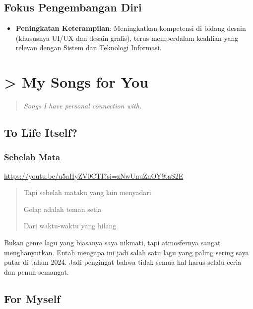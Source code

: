 \documentclass[
  letterpaper,
  DIV=11,
  numbers=noendperiod]{scrreprt}
\providecommand{\tightlist}{%
  \setlength{\itemsep}{0pt}\setlength{\parskip}{0pt}}
\begin{document}
\section{Fokus Pengembangan Diri}\label{fokus-pengembangan-diri}

\begin{itemize}
\tightlist
\item
  \textbf{Peningkatan Keterampilan}: Meningkatkan kompetensi di bidang
  desain (khususnya UI/UX dan desain grafis), terus memperdalam keahlian
  yang relevan dengan Sistem dan Teknologi Informasi.
\end{itemize}


\chapter{\textgreater{} My Songs for You}\label{my-songs-for-you}

\begin{quote}
\emph{Songs I have personal connection with.}
\end{quote}

\section{To Life Itself?}\label{to-life-itself}

\subsection{Sebelah Mata}\label{sebelah-mata}

\url{https://youtu.be/u5aHyZV0CTI?si=zNwUnuZnOY9taS2E}

\begin{quote}
Tapi sebelah mataku yang lain menyadari

Gelap adalah teman setia

Dari waktu-waktu yang hilang
\end{quote}

Bukan genre lagu yang biasanya saya nikmati, tapi atmosfernya sangat
menghanyutkan. Entah mengapa ini jadi salah satu lagu yang paling sering
saya putar di tahun 2024. Jadi pengingat bahwa tidak semua hal harus
selalu ceria dan penuh semangat.

\section{For Myself}\label{for-myself}
\end{document}
